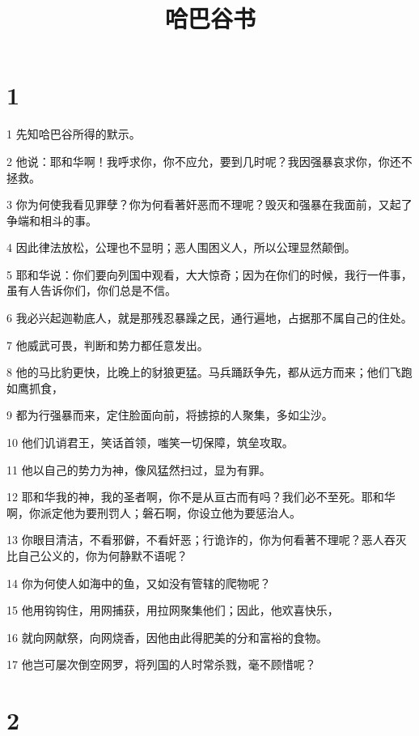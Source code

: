 

\title{哈巴谷书}


\chapter{1}

\par 1 先知哈巴谷所得的默示。
\par 2 他说：耶和华啊！我呼求你，你不应允，要到几时呢？我因强暴哀求你，你还不拯救。
\par 3 你为何使我看见罪孽？你为何看著奸恶而不理呢？毁灭和强暴在我面前，又起了争端和相斗的事。
\par 4 因此律法放松，公理也不显明；恶人围困义人，所以公理显然颠倒。
\par 5 耶和华说：你们要向列国中观看，大大惊奇；因为在你们的时候，我行一件事，虽有人告诉你们，你们总是不信。
\par 6 我必兴起迦勒底人，就是那残忍暴躁之民，通行遍地，占据那不属自己的住处。
\par 7 他威武可畏，判断和势力都任意发出。
\par 8 他的马比豹更快，比晚上的豺狼更猛。马兵踊跃争先，都从远方而来；他们飞跑如鹰抓食，
\par 9 都为行强暴而来，定住脸面向前，将掳掠的人聚集，多如尘沙。
\par 10 他们讥诮君王，笑话首领，嗤笑一切保障，筑垒攻取。
\par 11 他以自己的势力为神，像风猛然扫过，显为有罪。
\par 12 耶和华我的神，我的圣者啊，你不是从亘古而有吗？我们必不至死。耶和华啊，你派定他为要刑罚人；磐石啊，你设立他为要惩治人。
\par 13 你眼目清洁，不看邪僻，不看奸恶；行诡诈的，你为何看著不理呢？恶人吞灭比自己公义的，你为何静默不语呢？
\par 14 你为何使人如海中的鱼，又如没有管辖的爬物呢？
\par 15 他用钩钩住，用网捕获，用拉网聚集他们；因此，他欢喜快乐，
\par 16 就向网献祭，向网烧香，因他由此得肥美的分和富裕的食物。
\par 17 他岂可屡次倒空网罗，将列国的人时常杀戮，毫不顾惜呢？

\chapter{2}

